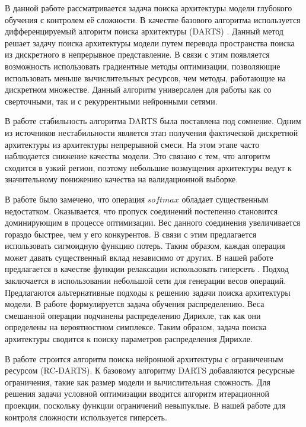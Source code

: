\documentclass[12pt, twoside]{article}
\begin{document}
В данной работе рассматривается задача поиска архитектуры модели глубокого обучения с контролем её сложности. В качестве базового алгоритма используется дифференцируемый алгоритм поиска архитектуры (DARTS) \cite{journals/corr/abs-1806-09055}. Данный метод решает задачу поиска архитектуры модели путем перевода пространства поиска из дискретного в непрерывное представление. В связи с этим появляется возможность использовать градиентные методы оптимизации, позволяющие использовать меньше вычислительных ресурсов, чем методы, работающие на дискретном множестве. Данный алгоритм универсален для работы как со сверточными, так и с рекуррентными нейронными сетями.

В работе \cite{journals/corr/abs-2002-05283} стабильность алгоритма DARTS была поставлена под сомнение. Одним из источников нестабильности является этап получения фактической дискретной архитектуры из архитектуры непрерывной смеси. На этом этапе часто наблюдается снижение качества модели. Это связано с тем, что алгоритм сходится в узкий регион, поэтому  небольшие возмущения архитектуры ведут к значительному понижению качества на валидационной выборке. 

В работе \cite{journals/corr/abs-1911-12126} было замечено, что операция $softmax$ обладает существенным недостатком. Оказывается, что пропуск соединений постепенно становится доминирующим в процессе оптимизации. Вес данного соединения увеличивается гораздо быстрее, чем у его конкурентов. В связи с этим предлагается использовать сигмоидную  функцию потерь. Таким образом, каждая операция может давать существенный вклад независимо от других. В нашей работе предлагается в качестве функции релаксации использовать гиперсеть \cite{journals/corr/HaDL16}. Подход заключается в использовании небольшой сети для генерации весов операций.
 Предлагаются альтернативные подходы к решению задачи поиска архитектуры модели. В работе \cite{journals/corr/abs-2006-10355} формулируется задача обучения распределению. Веса смешанной операции подчинены распределению Дирихле, так как они определены на вероятностном симплексе. Таким образом, задача поиска архитектуры сводится к поиску параметров распределения Дирихле.

В работе \cite{journals/corr/abs-1912-12814} строится алгоритм поиска нейронной архитектуры с ограниченным ресурсом (RC-DARTS). К базовому алгоритму DARTS добавляются ресурсные ограничения, такие как размер модели и вычислительная сложность. Для решения задачи условной оптимизации вводится алгоритм итерационной проекции, поскольку функции ограничений невыпуклые. В нашей работе для контроля сложности используется гиперсеть.
\end{document}
